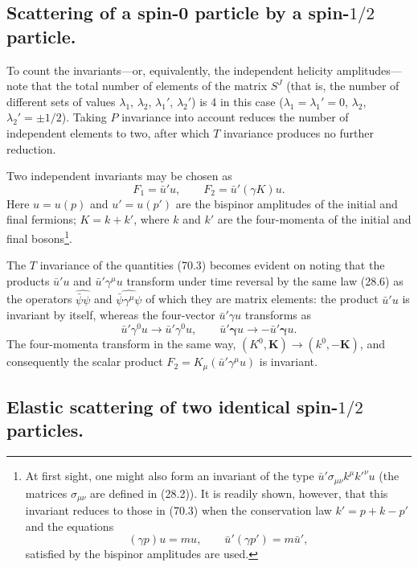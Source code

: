 \subsection*{Scattering of a spin-0 particle by a spin-$1/2$ particle.}

To count the invariants---or, equivalently, the independent helicity amplitudes---note that the total number of elements of the matrix $S^J$ (that is, the number of different sets of values $\lambda_1$, $\lambda_2$, $\lambda_1'$, $\lambda_2'$) is 4 in this case ($\lambda_1=\lambda_1'=0$, $\lambda_2$, $\lambda_2'=\pm1/2$). Taking $P$ invariance into account reduces the number of independent elements to two, after which $T$ invariance produces no further reduction.

Two independent invariants may be chosen as
\begin{equation}
F_1=\bar u'u,\qquad F_2=\bar u'(\gamma K)u.
\tag{70.3}
\end{equation}
Here $u=u(p)$ and $u'=u(p')$ are the bispinor amplitudes of the initial and final fermions; $K=k+k'$, where $k$ and $k'$ are the four-momenta of the initial and final bosons\footnote{At first sight, one might also form an invariant of the type $\bar u'\sigma_{\mu\nu}k^\mu k'^{\nu}u$ (the matrices $\sigma_{\mu\nu}$ are defined in (28.2)). It is readily shown, however, that this invariant reduces to those in (70.3) when the conservation law $k'=p+k-p'$ and the equations
\[
(\gamma p)u=mu,\qquad \bar u'(\gamma p')=m\bar u',
\]
satisfied by the bispinor amplitudes are used.}.

The $T$ invariance of the quantities (70.3) becomes evident on noting that the products $\bar u'u$ and $\bar u'\gamma^\mu u$ transform under time reversal by the same law (28.6) as the operators $\widehat{\bar\psi\psi}$ and $\widehat{\bar\psi\gamma^\mu\psi}$ of which they are matrix elements: the product $\bar u'u$ is invariant by itself, whereas the four-vector $\bar u'\gamma u$ transforms as
\[
\bar u'\gamma^0u\to\bar u'\gamma^0u,
\qquad
\bar u'\boldsymbol\gamma u\to-\bar u'\boldsymbol\gamma u.
\]
The four-momenta transform in the same way, $(K^0,\mathbf K)\to(k^0,-\mathbf K)$, and consequently the scalar product $F_2=K_\mu(\bar u'\gamma^\mu u)$ is invariant.

\subsection*{Elastic scattering of two identical spin-$1/2$ particles.}

